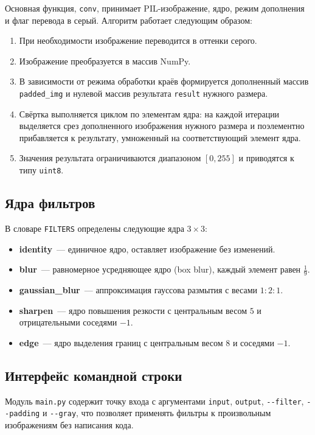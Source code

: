 \documentclass[a4paper]{article}
\begin{document}
Основная функция, \verb|conv|, принимает PIL-изображение, ядро, режим дополнения и флаг перевода в серый. Алгоритм работает следующим образом:

\begin{enumerate}
    \item При необходимости изображение переводится в оттенки серого.
    \item Изображение преобразуется в массив NumPy.
    \item В зависимости от режима обработки краёв формируется дополненный массив \verb|padded_img| и нулевой массив результата \verb|result| нужного размера.
    \item Свёртка выполняется циклом по элементам ядра: на каждой итерации выделяется срез дополненного изображения нужного размера и поэлементно прибавляется к результату, умноженный на соответствующий элемент ядра.
    \item Значения результата ограничиваются диапазоном $[0, 255]$ и приводятся к типу \verb|uint8|.
\end{enumerate}

\subsection{Ядра фильтров}

В словаре \verb|FILTERS| определены следующие ядра $3 \times 3$:

\begin{itemize}
    \item \textbf{identity}~--- единичное ядро, оставляет изображение без изменений.
    \item \textbf{blur}~--- равномерное усредняющее ядро (box blur), каждый элемент равен $\tfrac{1}{9}$.
    \item \textbf{gaussian\_blur}~--- аппроксимация гауссова размытия с весами $1{:}2{:}1$.
    \item \textbf{sharpen}~--- ядро повышения резкости с центральным весом $5$ и отрицательными соседями $-1$.
    \item \textbf{edge}~--- ядро выделения границ с центральным весом $8$ и соседями $-1$.
\end{itemize}

\subsection{Интерфейс командной строки}

Модуль \verb|main.py| содержит точку входа с аргументами \verb|input|, \verb|output|, \verb|--filter|, \verb|--padding| и \verb|--gray|, что позволяет применять фильтры к произвольным изображениям без написания кода.
\end{document}

